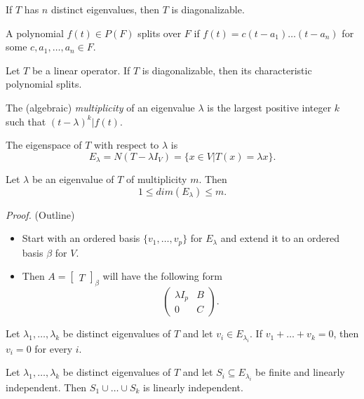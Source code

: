 \documentclass[12pt]{article}
\newenvironment{lemma}[2][Lemma]{\begin{trivlist}
\item[\hskip \labelsep {\bfseries #1}\hskip \labelsep {\bfseries #2.}]}{\end{trivlist}}
\newenvironment{theorem}[2][Theorem]{\begin{trivlist}
\item[\hskip \labelsep {\bfseries #1}\hskip \labelsep {\bfseries #2.}]}{\end{trivlist}}
\newenvironment{corollary}[2][Corollary]{\begin{trivlist}
\item[\hskip \labelsep {\bfseries #1}\hskip \labelsep {\bfseries #2}]}{\end{trivlist}}
\newenvironment{definition}[2][Definition]{\begin{trivlist}
\item[\hskip \labelsep {\bfseries #1}\hskip \labelsep {\bfseries #2}]}{\end{trivlist}}
\begin{document}
\begin{corollary}{6}
If $T$ has $n$ distinct eigenvalues, then $T$ is diagonalizable.
\end{corollary}

\begin{definition}{4}
A polynomial $f(t) \in P(F)$ splits over $F$ if $f(t) = c(t - a_1) \dots (t - a_n)$ for some $c, a_1, \dots, a_n \in F$.
\end{definition}

\begin{theorem}{5.6}
Let $T$ be a linear operator. If $T$ is diagonalizable, then its characteristic polynomial splits.
\end{theorem}

\begin{definition}{5}
The (algebraic) \textit{multiplicity} of an eigenvalue $\lambda$ is the largest positive integer $k$ such that $(t - \lambda)^k | f(t)$.
\end{definition}

\noindent The eigenspace of $T$ with respect to $\lambda$ is $$E_\lambda = N(T - \lambda I_V) = \{x \in V | T(x) = \lambda x\}.$$

\begin{theorem}{5.7}
Let $\lambda$ be an eigenvalue of $T$ of multiplicity $m$. Then $$1 \leq dim(E_\lambda) \leq m.$$
\end{theorem}

\textit{Proof.} (Outline)
\begin{itemize}
    \item Start with an ordered basis $\{v_1, \dots, v_p\}$ for $E_\lambda$ and extend it to an ordered basis $\beta$ for $V$.
    
    \item Then $A = \begin{bmatrix} T \end{bmatrix}_\beta$ will have the following form $$\begin{pmatrix}
    \lambda I_p & B \\ 0 & C
    \end{pmatrix}.$$
\end{itemize}

\begin{lemma}{9}
Let $\lambda_1, \dots, \lambda_k$ be distinct eigenvalues of $T$ and let $v_i \in E_{\lambda_i}$. If $v_1 + \dots + v_k = 0$, then $v_i = 0$ for every $i$.
\end{lemma}

\begin{theorem}{5.8}
Let $\lambda_1, \dots, \lambda_k$ be distinct eigenvalues of $T$ and let $S_i \subseteq E_{\lambda_i}$ be finite and linearly independent. Then $S_1 \cup \dots \cup S_k$ is linearly independent.
\end{theorem}
\end{document}
